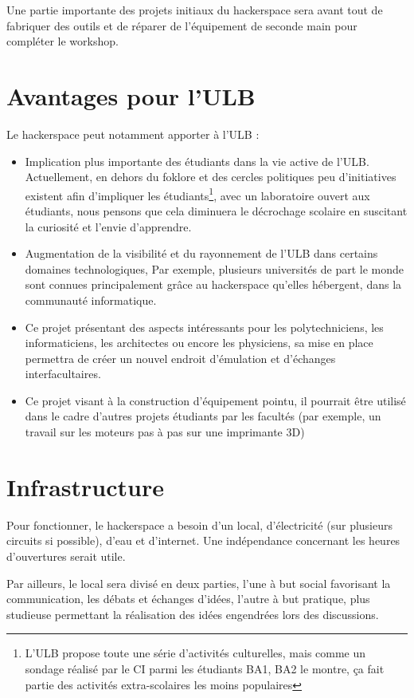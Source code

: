 \documentclass{article}
\begin{document}
Une partie importante des projets initiaux du hackerspace sera avant tout de fabriquer des outils et de réparer de l'équipement de seconde main pour compléter le workshop.

\section{Avantages pour l'ULB}

Le hackerspace peut notamment apporter à l'ULB : 
\begin{itemize}
\item Implication plus importante des étudiants dans la vie active de l'ULB.
Actuellement, en dehors du foklore et des cercles politiques peu d'initiatives existent afin d'impliquer les étudiants\footnote{L'ULB
propose toute une série d'activités culturelles, mais comme un sondage réalisé par le CI parmi les étudiants BA1, BA2
le montre, ça fait partie des activités extra-scolaires les moins populaires},
avec un laboratoire ouvert aux étudiants, nous pensons que cela diminuera le décrochage
scolaire en suscitant la curiosité et l'envie d'apprendre.
\item Augmentation de la visibilité et du rayonnement de l'ULB dans certains domaines technologiques,
Par exemple, plusieurs universités de part le monde sont connues
principalement grâce au hackerspace qu'elles hébergent, dans la communauté informatique.
\item Ce projet présentant des aspects intéressants pour les polytechniciens, les informaticiens,
les architectes ou encore les physiciens, sa mise en place permettra de créer un nouvel endroit d'émulation
et d'échanges interfacultaires.
\item Ce projet visant à la construction d'équipement pointu, il pourrait être utilisé dans le cadre d'autres projets étudiants par les facultés (par exemple, un travail sur les moteurs pas à pas sur une imprimante 3D)
\end{itemize}

\section{Infrastructure}

Pour fonctionner, le hackerspace a besoin d'un local, d'électricité 
(sur plusieurs circuits si possible), d'eau et d'internet. Une indépendance concernant les heures d'ouvertures serait utile.

Par ailleurs, le local sera divisé en deux parties, l'une à but social favorisant la communication, les débats et échanges d'idées, l'autre à but pratique, plus studieuse permettant la réalisation des idées engendrées lors des discussions. 
\end{document}
